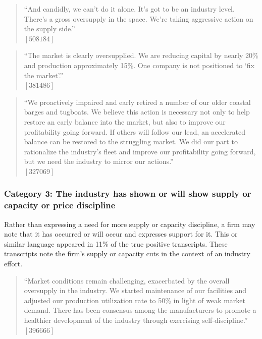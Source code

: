 \begin{quote}
``And candidly, we can't do it alone. It's got to be an industry level. There's a gross oversupply in the space. We're taking aggressive action on the supply side.'' \\
$[508184]$
\end{quote}

\begin{quote}
``The market is clearly oversupplied. We are reducing capital by nearly 20\% and production approximately 15\%. One company is not positioned to `fix the market'.'' \\
$[381486]$
\end{quote}

\begin{quote}
``We proactively impaired and early retired a number of our older coastal barges and tugboats. We believe this action is necessary not only to help restore an early balance into the market, but also to improve our profitability going forward. If others will follow our lead, an accelerated balance can be restored to the struggling market. We did our part to rationalize the industry's fleet and improve our profitability going forward, but we need the industry to mirror our actions.'' \\
$[327069]$
\end{quote}

\subsubsection{Category 3: The industry has shown or will show supply or capacity or price discipline}
Rather than expressing a need for more supply or capacity discipline, a firm may note that it has occurred or will occur and expresses support for it. This or similar language appeared in 11\% of the true positive transcripts. These transcripts note the firm’s supply or capacity cuts in the context of an industry effort.

\begin{quote}
``Market conditions remain challenging, exacerbated by the overall oversupply in the industry. We started maintenance of our facilities and adjusted our production utilization rate to 50\% in light of weak market demand. There has been consensus among the manufacturers to promote a healthier development of the industry through exercising self-discipline.'' \\
$[396666]$
\end{quote}

